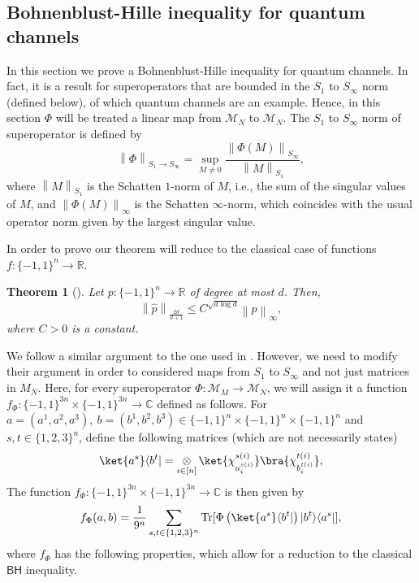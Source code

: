 \documentclass[11pt]{article}
\newcommand{\norm}[1]{\left\|{#1}\right\|}
\newcommand{\BH}{\textsf{BH}}
\theoremstyle{plain}
\newtheorem{theorem}{Theorem}
\DeclareMathOperator{\Tr}{Tr}
\theoremstyle{plain}
\theoremstyle{definition}
\theoremstyle{remark}
\theoremstyle{named}
\begin{document}
\subsection{Bohnenblust-Hille inequality for quantum channels}
In this section we prove a Bohnenblust-Hille inequality for quantum channels.  In fact, it is a result for superoperators that are bounded in the $S_1$ to $S_\infty$ norm (defined below), of which quantum channels are an example. Hence, in this section $\Phi$ will be treated a linear map from $\mathcal{M}_N$ to $\mathcal{M}_N$.  The $S_1$ to $S_\infty$ norm of superoperator is defined by $$\norm{\Phi}_{S_1\to S_\infty}=\sup_{M\neq 0}\frac{\norm{\Phi(M)}_{S_\infty}}{\norm{M}_{S_1}},$$ where $\norm{M}_{S_1}$ is the Schatten $1$-norm of $M$, i.e., the sum of the singular values of $M$, and $\norm{\Phi(M)}_{\infty}$ is the Schatten $\infty$-norm, which coincides with the usual operator norm given by the largest singular value.

In order to prove our theorem will reduce to the classical case of functions $f:\{-1,1\}^n\to \mathbb R$.
\begin{theorem}[\cite{defant2019fourier}]
\label{theo:DMP}
    Let $p:\{-1,1\}^n\to \mathbb R$ of degree at most $d$. Then, $$
    \norm{\widehat p}_{\frac{2d}{d+1}}\leq C^{\sqrt{d\log d}}\norm{p}_\infty,
    $$
    where $C>0$ is a constant.
\end{theorem}

\noindent We follow a similar argument to the one used in  \cite{volberg2023noncommutative}. However, we need to modify their argument in order to considered maps from $S_1$ to $S_\infty$ and not just matrices in $M_N$. Here, for every superoperator $\Phi:\mathcal{M}_M\to\mathcal{M}_N$, we will assign it a function $f_{\Phi}:\{-1,1\}^{3n}\times \{-1,1\}^{3n}\to\mathbb C$ defined as follows. For $a=(a^1,a^2,a^3),\ b=(b^1,b^2,b^3)\in\{-1,1\}^n\times\{-1,1\}^n\times\{-1,1\}^n$ and $s,t\in \{1,2,3\}^n$, define the following matrices (which are not necessarily states)
$$
\ket{a^s}\langle b^{t}|=\mathop{\otimes}_{i\in [n]}\ket{\chi^{s(i)}_{a^{s(i)}_i}}\bra{\chi^{t(i)}_{b^{{t}(i)}_i}},
$$
The function $f_{\Phi}:\{-1,1\}^{3n}\times\{-1,1\}^{3n}\to \mathbb C$ is then given by 
$$
f_{\Phi}( a,b)=\frac{1}{9^n}\sum_{s,t\in \{1,2,3\}^n}\Tr[\Phi\left(\ket{a^s}\langle b^{t}|\right)|b^{t}\rangle\langle a^{s}|],
$$ where $f_{\Phi}$ has the following properties, which allow for a reduction to the classical $\BH$ inequality. 
\end{document}
